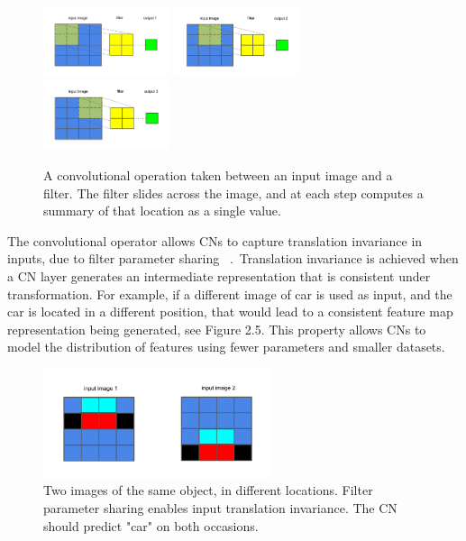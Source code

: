 \begin{figure}[H]
	\centering
	\includegraphics[width=0.33\textwidth, height=0.25\textwidth]{convolution1}\hfill
	\includegraphics[width=0.33\textwidth, height=0.25\textwidth]{convolution2}\hfill
	\includegraphics[width=0.33\textwidth, height=0.25\textwidth]{convolution3}
	\captionsetup{justification=centering}
	\caption{A convolutional operation taken between an input image and a filter. The filter slides across the image, and at each step computes a summary of that location as a single value.}
\end{figure}

\noindent The convolutional operator allows CNs to capture translation invariance in inputs, due to filter parameter sharing \unskip ~\citep{simonyan2014very}.\ Translation invariance is achieved when a CN layer generates an intermediate representation that is consistent under transformation. For example, if a different image of  car is used as input, and the car is located in a different position, that would lead to a consistent feature map representation being generated, see Figure 2.5. This property allows CNs to model the distribution of features using fewer parameters and smaller datasets. \par 

\begin{figure}[H]
   	\centering
    	\includegraphics[width=0.6\textwidth, height=0.3\textwidth]{translation_invariance}
	\captionsetup{justification=centering}
	\caption{Two images of the same object, in different locations. Filter parameter sharing enables input translation invariance. The CN should predict "car" on both occasions.}
\end{figure}

